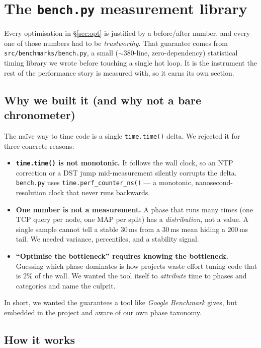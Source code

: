 \documentclass[11pt,a4paper]{article}
\newcommand{\code}[1]{\texttt{\small #1}}
\begin{document}
\section{The \code{bench.py} measurement library}\label{sec:bench}

Every optimisation in \S\ref{sec:opt} is justified by a before/after number, and
every one of those numbers had to be \emph{trustworthy}. That guarantee comes
from \code{src/benchmarks/bench.py}, a small ($\sim$380-line, zero-dependency)
statistical timing library we wrote before touching a single hot loop. It is the
instrument the rest of the performance story is measured with, so it earns its
own section.

\subsection{Why we built it (and why not a bare chronometer)}

The naïve way to time code is a single \code{time.time()} delta. We rejected it
for three concrete reasons:
\begin{itemize}
\item \textbf{\code{time.time()} is not monotonic.} It follows the wall clock, so
an NTP correction or a DST jump mid-measurement silently corrupts the delta.
\code{bench.py} uses \code{time.perf\_counter\_ns()} --- a monotonic,
nanosecond-resolution clock that never runs backwards.
\item \textbf{One number is not a measurement.} A phase that runs many times (one
TCP query per node, one MAP per split) has a \emph{distribution}, not a value. A
single sample cannot tell a stable 30\,ms from a 30\,ms mean hiding a 200\,ms
tail. We needed variance, percentiles, and a stability signal.
\item \textbf{``Optimise the bottleneck'' requires knowing the bottleneck.}
Guessing which phase dominates is how projects waste effort tuning code that is
$2\%$ of the wall. We wanted the tool itself to \emph{attribute} time to phases
and categories and name the culprit.
\end{itemize}
In short, we wanted the guarantees a tool like \emph{Google Benchmark} gives, but
embedded in the project and aware of our own phase taxonomy.

\subsection{How it works}
\end{document}
